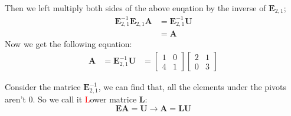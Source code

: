         Then we left multiply both sides of the above euqation by the inverse of $\mathbf{E}_{2,1}$;
            \begin{equation}
                \begin{aligned}
                    \mathbf{E}_{2,1}^{-1} \mathbf{E}_{2,1} \mathbf{A} &= \mathbf{E}_{2,1}^{-1} \mathbf{U}\\
                                                                    & = \mathbf{A}
                \end{aligned}
            \end{equation}       
        Now we get the following equation:
            \begin{equation}
                \begin{aligned}
                    \mathbf{A} &= \mathbf{E}_{2,1}^{-1} \mathbf{U}
                               &= 
                               \begin{bmatrix}
                                    1 & 0 \\
                                    \boxed{4} & 1
                                \end{bmatrix}      
                                \begin{bmatrix}
                                    2 & 1\\
                                    0 & 3
                                \end{bmatrix}                 
                \end{aligned}
            \end{equation}  
    
        Consider the matrice $\mathbf{E}_{2,1}^{-1}$, we can find that, all the elements under the pivots aren't 0.
        So we call it \textcolor{red}{L}ower matrice \textbf{L}:
            \begin{equation}
                \mathbf{E} \mathbf{A} =  \mathbf{U} \rightarrow \mathbf{A} =  \mathbf{L} \mathbf{U}
            \end{equation}
        
